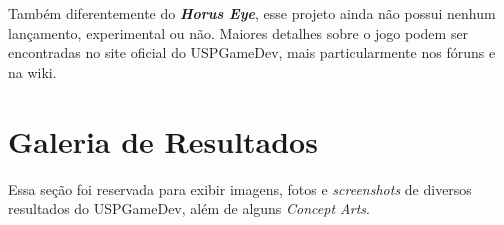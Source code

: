 \documentclass[12pt,onecolumn,a4paper]{article}
\begin{document}
        Também diferentemente do \textit{\textbf{Horus Eye}}, esse projeto ainda não possui nenhum
        lançamento, experimental ou não. Maiores detalhes sobre o jogo podem ser encontradas no site
        oficial do USPGameDev, mais particularmente nos fóruns e na wiki.



    



\clearpage
\section{\LARGE Galeria de Resultados}

    Essa seção foi reservada para exibir imagens, fotos e \textit{screenshots} de diversos
    resultados do USPGameDev, além de alguns \textit{Concept Arts}\footnotemark.
        
    
        \FloatBarrier
        
    
\end{document}
